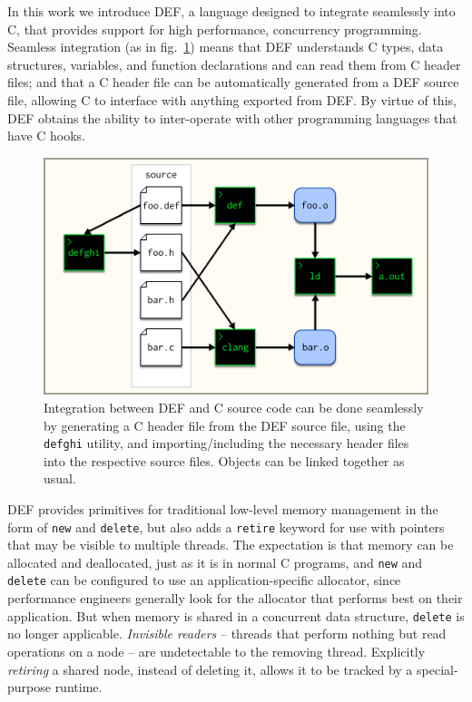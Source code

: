 In this work we introduce DEF, a language designed to integrate seamlessly into C, that provides support for high performance, concurrency programming.  Seamless integration (as in fig.~\ref{fig:seemless-integration}) means that DEF understands C types, data structures, variables, and function declarations and can read them from C header files; and that a C header file can be automatically generated from a DEF source file, allowing C to interface with anything exported from DEF.  By virtue of this, DEF obtains the ability to inter-operate with other programming languages that have C hooks.

\begin{figure}[htbp!]
        \centering
        \includegraphics[scale=0.25]{gfx/seemless-integration}
        \caption{Integration between DEF and C source code can be done seamlessly by generating a C header file from the DEF source file, using the \texttt{defghi} utility, and importing/including the necessary header files into the respective source files.  Objects can be linked together as usual.}
        \label{fig:seemless-integration}
\end{figure}

DEF provides primitives for traditional low-level memory management in the form of \texttt{new} and \texttt{delete}, but also adds a \texttt{retire} keyword for use with pointers that may be visible to multiple threads.  The expectation is that memory can be allocated and deallocated, just as it is in normal C programs, and \texttt{new} and \texttt{delete} can be configured to use an application-specific allocator, since performance engineers generally look for the allocator that performs best on their application.  But when memory is shared in a concurrent data structure, \texttt{delete} is no longer applicable.  \textit{Invisible readers} -- threads that perform nothing but read operations on a node -- are undetectable to the removing thread.  Explicitly \textit{retiring} a shared node, instead of deleting it, allows it to be tracked by a special-purpose runtime.

